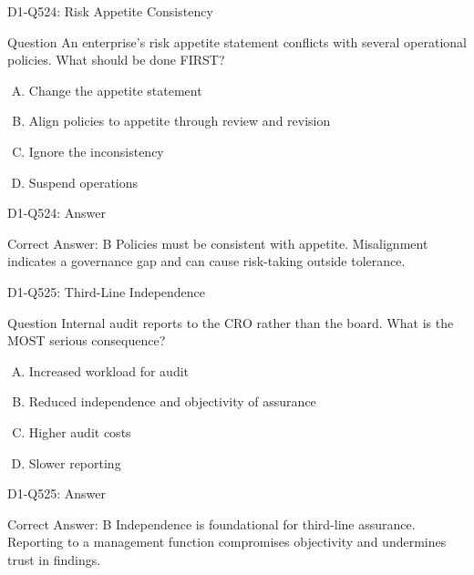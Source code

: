 \documentclass{beamer}
\begin{document}
\begin{frame}{D1-Q524: Risk Appetite Consistency}
	\begin{block}{Question}
		An enterprise's risk appetite statement conflicts with several operational policies. What should be done FIRST?
	\end{block}
	\begin{enumerate}[(A)]
		\item Change the appetite statement
		\item Align policies to appetite through review and revision
		\item Ignore the inconsistency
		\item Suspend operations
	\end{enumerate}
\end{frame}
\begin{frame}{D1-Q524: Answer}
	\begin{block}{Correct Answer: B}
		Policies must be consistent with appetite. Misalignment indicates a governance gap and can cause risk-taking outside tolerance.
	\end{block}
\end{frame}

\begin{frame}{D1-Q525: Third-Line Independence}
	\begin{block}{Question}
		Internal audit reports to the CRO rather than the board. What is the MOST serious consequence?
	\end{block}
	\begin{enumerate}[(A)]
		\item Increased workload for audit
		\item Reduced independence and objectivity of assurance
		\item Higher audit costs
		\item Slower reporting
	\end{enumerate}
\end{frame}
\begin{frame}{D1-Q525: Answer}
	\begin{block}{Correct Answer: B}
		Independence is foundational for third-line assurance. Reporting to a management function compromises objectivity and undermines trust in findings.
	\end{block}
\end{frame}
\end{document}
